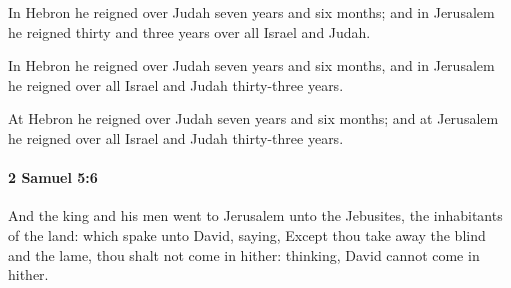 			\begin{versebox}
					\item[BHS] 
					\item[ASV] In Hebron he reigned over Judah seven years and six months; and in Jerusalem he reigned thirty and three years over all Israel and Judah.
					\item[NIV] In Hebron he reigned over Judah seven years and six months, and in Jerusalem he reigned over all Israel and Judah thirty-three years.
					\item[NRSV] At Hebron he reigned over Judah seven years and six months; and at Jerusalem he reigned over all Israel and Judah thirty-three years.
			\end{versebox}

		\paragraph{2 Samuel 5:6} %
			\label{2SAMUEL-5-6}

			And the king and his men went to Jerusalem unto the Jebusites, the inhabitants of the land: which spake unto David, saying, Except thou take away the blind and the lame, thou shalt not come in hither: thinking, David cannot come in hither.

